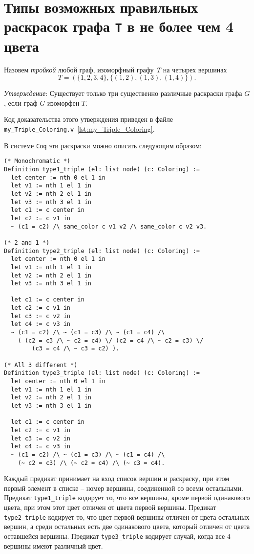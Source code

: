\section{Типы возможных правильных раскрасок графа {\tt T} в не более чем 4 цвета}

Назовем {\it тройкой} любой граф, изоморфный графу {\it T} на четырех вершинах $$T = (\{1, 2, 3, 4\} , \{(1, 2), (1, 3), (1, 4) \} ).$$

{\it Утверждение}: Существует только три существенно различные раскраски графа $G$, если граф $G$ изоморфен $T$.

Код доказательства этого утверждения приведен в файле {\tt my\_Triple\_Coloring.v}~\ref{lst:my_Triple_Coloring}. 

В системе {\tt Coq} эти раскраски можно описать следующим образом:

\begin{verbatim}
(* Monochromatic *)
Definition type1_triple (el: list node) (c: Coloring) :=
  let center := nth 0 el 1 in
  let v1 := nth 1 el 1 in
  let v2 := nth 2 el 1 in
  let v3 := nth 3 el 1 in
  let c1 := c center in
  let c2 := c v1 in
  ~ (c1 = c2) /\ same_color c v1 v2 /\ same_color c v2 v3.

(* 2 and 1 *)
Definition type2_triple (el: list node) (c: Coloring) :=
  let center := nth 0 el 1 in
  let v1 := nth 1 el 1 in
  let v2 := nth 2 el 1 in
  let v3 := nth 3 el 1 in

  let c1 := c center in
  let c2 := c v1 in
  let c3 := c v2 in 
  let c4 := c v3 in
  ~ (c1 = c2) /\ ~ (c1 = c3) /\ ~ (c1 = c4) /\
    ( (c2 = c3 /\ ~ c2 = c4) \/ (c2 = c4 /\ ~ c2 = c3) \/ 
        (c3 = c4 /\ ~ c3 = c2) ).

(* All 3 different *)
Definition type3_triple (el: list node) (c: Coloring) :=
  let center := nth 0 el 1 in
  let v1 := nth 1 el 1 in
  let v2 := nth 2 el 1 in
  let v3 := nth 3 el 1 in

  let c1 := c center in
  let c2 := c v1 in
  let c3 := c v2 in 
  let c4 := c v3 in
  ~ (c1 = c2) /\ ~ (c1 = c3) /\ ~ (c1 = c4) /\
    (~ c2 = c3) /\ (~ c2 = c4) /\ (~ c3 = c4).
\end{verbatim}

Каждый предикат принимает на вход список вершин и раскраску, при этом первый элемент в списке -- номер вершины, соединенной со всеми остальными. Предикат {\tt type1\_triple} кодирует то, что все вершины, кроме первой одинакового цвета, при этом этот цвет отличен от цвета первой вершины. Предикат {\tt type2\_triple} кодирует то, что цвет первой вершины отличен от цвета остальных вершин, а среди остальных есть две одинакового цвета, который отличен от цвета оставшейся вершины. Предикат {\tt type3\_triple} кодирует случай, когда все 4 вершины имеют различный цвет.

